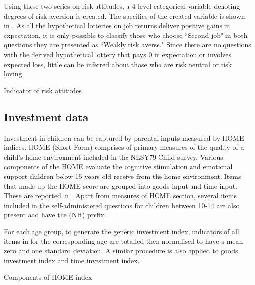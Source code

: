 \documentclass[]{article}
\begin{document}
Using these two series on risk attitudes, a 4-level categorical variable denoting degrees of risk aversion is created. The specifics of the created variable is shown in . As all the hypothetical lotteries on job returns deliver positive gains in expectation, it is only possible to classify those who choose ``Second job" in both questions they are presented as ``Weakly risk averse." Since there are no questions with the derived hypothetical lottery that pays 0 in expectation or involves expected loss, little can be inferred about those who are risk neutral or risk loving.  

\begin{table}[!h]
	\centering
	\setlength{\extrarowheight}{0.1cm}
	\caption{Indicator of risk attitudes}	
	
	\label{table:1}
\end{table}



\subsection{Investment data}
Investment in children can be captured by parental inputs measured by HOME indices. HOME (Short Form) comprises of primary measures of the quality of a child's home environment included in the NLSY79 Child survey. Various components of the HOME evaluate the cognitive stimulation and emotional support children below 15 years old receive from the home environment. Items that made up the HOME score are grouped into goods input and time input. These are reported in . Apart from measures of HOME section, several items included in the self-administered questions for children between 10-14 are also present and have the (NH) prefix.  

For each age group, to generate the generic investment index, indicators of all items in  for the corresponding age are totalled then normalised to have a mean zero and one standard deviation. A similar procedure is also applied to goods investment index and time investment index.

\begin{table}
	\centering
	\setlength{\extrarowheight}{0.1cm}
	\caption{Components of HOME index}	
	
	\label{table:2}
\end{table}  


\begin{table}
	
\end{table}

\pagebreak

%
%
\end{document}
